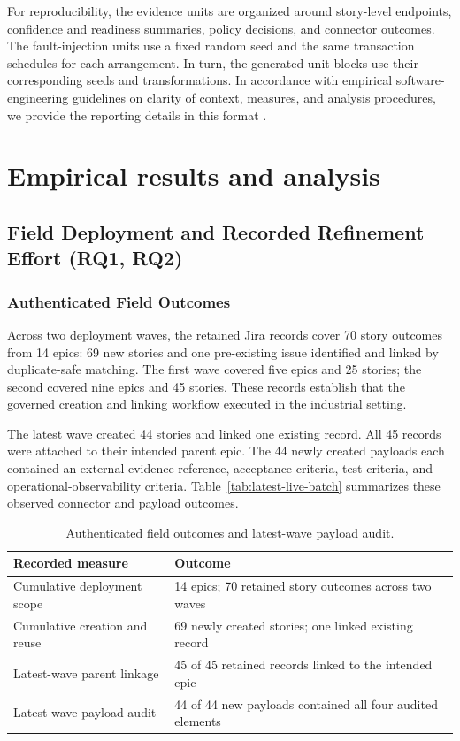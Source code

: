 \documentclass[pdflatex,sn-basic]{sn-jnl}
\begin{document}
For reproducibility, the evidence units are organized around story-level endpoints, confidence and readiness summaries, policy decisions, and connector outcomes. The fault-injection units use a fixed random seed and the same transaction schedules for each arrangement. In turn, the generated-unit blocks use their corresponding seeds and transformations. In accordance with empirical software-engineering guidelines on clarity of context, measures, and analysis procedures, we provide the reporting details in this format \citep{R54,R71,R55,R70}.

\FloatBarrier
\section{Empirical results and analysis}

\subsection{Field Deployment and Recorded Refinement Effort (RQ1, RQ2)}
\subsubsection{Authenticated Field Outcomes}
Across two deployment waves, the retained Jira records cover 70 story outcomes from 14 epics: 69 new stories and one pre-existing issue identified and linked by duplicate-safe matching. The first wave covered five epics and 25 stories; the second covered nine epics and 45 stories. These records establish that the governed creation and linking workflow executed in the industrial setting.

The latest wave created 44 stories and linked one existing record. All 45 records were attached to their intended parent epic. The 44 newly created payloads each contained an external evidence reference, acceptance criteria, test criteria, and operational-observability criteria. Table~\ref{tab:latest-live-batch} summarizes these observed connector and payload outcomes.

\begin{table}[htbp]
\centering
\small
\caption{Authenticated field outcomes and latest-wave payload audit.}
\label{tab:cumulative-live-evidence}
\label{tab:latest-live-batch}
\label{tab:live-endpoint-statistics}
\begin{tabularx}{\textwidth}{@{}lX@{}}
\toprule
Recorded measure & Outcome \\
\midrule
Cumulative deployment scope & 14 epics; 70 retained story outcomes across two waves \\
Cumulative creation and reuse & 69 newly created stories; one linked existing record \\
Latest-wave parent linkage & 45 of 45 retained records linked to the intended epic \\
Latest-wave payload audit & 44 of 44 new payloads contained all four audited elements \\
\bottomrule
\end{tabularx}
\end{table}
\end{document}
